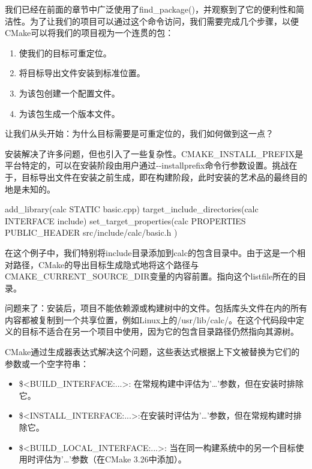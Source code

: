 
我们已经在前面的章节中广泛使用了find\_package()，并观察到了它的便利性和简洁性。为了让我们的项目可以通过这个命令访问，我们需要完成几个步骤，以便CMake可以将我们的项目视为一个连贯的包：

\begin{enumerate}
\item
使我们的目标可重定位。

\item
将目标导出文件安装到标准位置。

\item
为该包创建一个配置文件。

\item
为该包生成一个版本文件。
\end{enumerate}

让我们从头开始：为什么目标需要是可重定位的，我们如何做到这一点？


安装解决了许多问题，但也引入了一些复杂性。CMAKE\_INSTALL\_PREFIX是平台特定的，可以在安装阶段由用户通过-{}-installprefix命令行参数设置。挑战在于，目标导出文件在安装之前生成，即在构建阶段，此时安装的艺术品的最终目的地是未知的。


\begin{cmake}
add_library(calc STATIC basic.cpp)
target_include_directories(calc INTERFACE include)
set_target_properties(calc PROPERTIES
    PUBLIC_HEADER src/include/calc/basic.h
)
\end{cmake}

在这个例子中，我们特别将include目录添加到calc的包含目录中。由于这是一个相对路径，CMake的导出目标生成隐式地将这个路径与CMAKE\_CURRENT\_SOURCE\_DIR变量的内容前置。指向这个listfile所在的目录。

问题来了：安装后，项目不能依赖源或构建树中的文件。包括库头文件在内的所有内容都被复制到一个共享位置，例如Linux上的/usr/lib/calc/。在这个代码段中定义的目标不适合在另一个项目中使用，因为它的包含目录路径仍然指向其源树。

CMake通过生成器表达式解决这个问题，这些表达式根据上下文被替换为它们的参数或一个空字符串：

\begin{itemize}
\item
\$<BUILD\_INTERFACE:...>: 在常规构建中评估为'…'参数，但在安装时排除它。

\item
\$<INSTALL\_INTERFACE:...>:在安装时评估为'…'参数，但在常规构建时排除它。

\item
\$<BUILD\_LOCAL\_INTERFACE:...>: 当在同一构建系统中的另一个目标使用时评估为'…'参数（在CMake 3.26中添加）。
\end{itemize}

